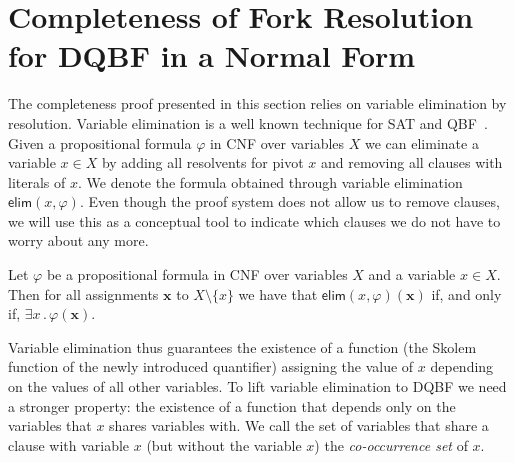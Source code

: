 \documentclass{svjour3}
\newcommand{\ldot}{\mathpunct{.}}
\newcommand{\ass}[1]{\mathbf{#1}}
\begin{document}
\section{Completeness of Fork Resolution for DQBF in a Normal Form}
\label{sect:completeness}

The completeness proof presented in this section relies on variable elimination by resolution.
Variable elimination is a well known technique for SAT and QBF~\cite{BuningKarpinskiFlogel/1995/ResolutionforQBF,Biere/2004/ResolveAndExpand}.
Given a propositional formula $\varphi$ in CNF over variables $X$ we can eliminate a variable $x\in X$ by adding all resolvents for pivot $x$ and removing all clauses with literals of $x$. 
We denote the formula obtained through variable elimination $\mathsf{elim}(x, \varphi)$.
Even though the proof system does not allow us to remove clauses, we will use this as a conceptual tool to indicate which clauses we do not have to worry about any more.


\begin{proposition}
	\label{prop:variableelimination}
	Let $\varphi$ be a propositional formula in CNF over variables $X$ and a variable $x\in X$.
	Then for all assignments $\ass x$ to $X\setminus\{x\}$ we have that $\mathsf{elim}(x,\varphi)(\ass x)$ if, and only if, $\exists x\ldot \varphi(\ass x)$. 
\end{proposition}

Variable elimination thus guarantees the existence of a function (the Skolem function of the newly introduced quantifier) assigning the value of $x$ depending on the values of all other variables.
To lift variable elimination to DQBF we need a stronger property: the existence of a function that depends only on the variables that $x$ shares variables with.
We call the set of variables that share a clause with variable $x$ (but without the variable $x$) the \emph{co-occurrence set} of $x$.

\end{document}
